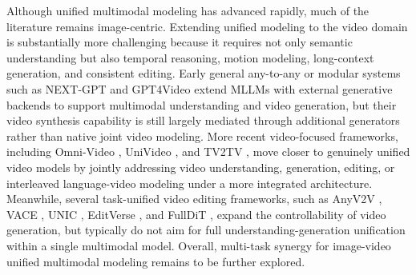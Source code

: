 Although unified multimodal modeling has advanced rapidly, much of the literature remains image-centric. Extending unified modeling to the video domain is substantially more challenging because it requires not only semantic understanding but also temporal reasoning, motion modeling, long-context generation, and consistent editing.
Early general any-to-any or modular systems such as NEXT-GPT \cite{wu2024next} and GPT4Video \cite{wang2024gpt4video} extend MLLMs with external generative backends to support multimodal understanding and video generation, but their video synthesis capability is still largely mediated through additional generators rather than native joint video modeling. More recent video-focused frameworks, including Omni-Video \cite{tan2025omni}, UniVideo \cite{wei2025univideo}, and TV2TV \cite{han2025tv2tv}, move closer to genuinely unified video models by jointly addressing video understanding, generation, editing, or interleaved language-video modeling under a more integrated architecture. Meanwhile, several task-unified video editing frameworks, such as AnyV2V \cite{ku2024anyv2v}, VACE \cite{jiang2025vace}, UNIC \cite{ye2025unic}, EditVerse \cite{ju2025editverse}, and FullDiT \cite{ju2025fulldit}, expand the controllability of video generation, but typically do not aim for full understanding-generation unification within a single multimodal model. 
Overall, multi-task synergy for image-video unified multimodal modeling remains to be further explored.







